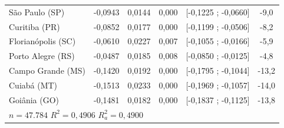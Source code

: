 \documentclass[12pt,a4paper,header]{abnt}
\begin{document}
\begin{center}
\begin{longtable}{lccccc}
São Paulo (SP) & -0,0943 & 0,0144 & 0,000 & [-0,1225 ; -0,0660] & -9,0 \\
Curitiba (PR) & -0,0852 & 0,0177 & 0,000 & [-0,1199 ; -0,0506] & -8,2 \\
Florianópolis (SC) & -0,0610 & 0,0227 & 0,007 & [-0,1055 ; -0,0166] & -5,9 \\
Porto Alegre (RS) & -0,0487 & 0,0185 & 0,008 & [-0,0850 ; -0,0125] & -4,8 \\
Campo Grande (MS) & -0,1420 & 0,0192 & 0,000 & [-0,1795 ; -0,1044] & -13,2 \\
Cuiabá (MT) & -0,1513 & 0,0233 & 0,000 & [-0,1969 ; -0,1057] & -14,0 \\
Goiânia (GO) & -0,1481 & 0,0182 & 0,000 & [-0,1837 ; -0,1125] & -13,8 \\
\midrule
\multicolumn{6}{l}{$n = 47.784$ \hspace{2cm} $R^2 = 0,4906$ \hspace{2cm} $R^2_a = 0,4900$} \\
\end{longtable}
\end{center}
\end{document}
